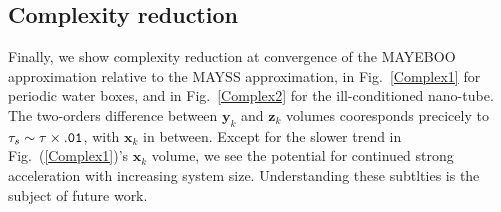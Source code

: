 \documentclass[letterpaper,twocolumn,amsmath,amsfont,amssymb,english,aps,jcp,preprintnumbers,groupaddress,nofootinbib,tightenlines,floatfix]{revtex4}
\newcommand{\mat}[1]{\boldsymbol{#1}}
\theoremstyle{plain}
\theoremstyle{remark}
\theoremstyle{plain}
\begin{document}
\subsection{Complexity reduction}
  
Finally, we show complexity reduction at convergence of the MAYEBOO approximation relative to the MAYSS approximation, 
in Fig.~\ref{Complex1} for periodic water boxes, and in Fig.~\ref{Complex2} for the ill-conditioned nano-tube. 
The two-orders difference between $\mat{y}_k$ and $\mat{z}_k$ volumes cooresponds precicely to $\tau_s \sim \tau \times {\tt .01}$, 
with $\mat{x}_k$ in between. Except for the slower trend in Fig.~(\ref{Complex1})'s $\mat{x}_k$ volume, we see the 
potential for continued strong acceleration with increasing system size.  Understanding these subtlties is the subject of future work. 
\end{document}
